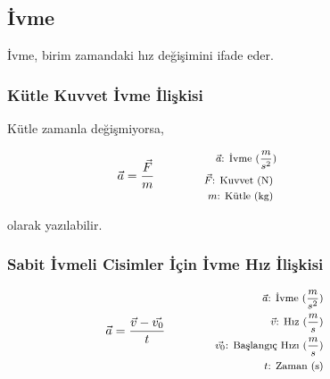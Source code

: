\subsection{İvme}

İvme, birim zamandaki hız değişimini ifade eder.

\subsubsection*{Kütle Kuvvet İvme İlişkisi}

Kütle zamanla değişmiyorsa,

\begin{equation}
    \vec{a} = \frac{\vec{F}}{m} \qquad \qquad \parbox{4cm}{\footnotesize$\begin{aligned}
        \vec{a}\text{: İvme } (\frac{m}{s^2}) \\
        \vec{F}\text{: Kuvvet (N) } \\
        m\text{: Kütle (kg) }
    \end{aligned}$}
\end{equation}

olarak yazılabilir.

\subsubsection*{Sabit İvmeli Cisimler İçin İvme Hız İlişkisi}
\begin{equation}
    \vec{a} = \frac{\vec{v} - \vec{v_0}}{t} \qquad \qquad \parbox{4cm}{\footnotesize$\begin{aligned}
        \vec{a}\text{: İvme } (\frac{m}{s^2}) \\
        \vec{v}\text{: Hız } (\frac{m}{s}) \\
        \vec{v_0}\text{: Başlangıç Hızı } (\frac{m}{s}) \\
        t\text{: Zaman (s)} 
\end{aligned}$}
\end{equation}